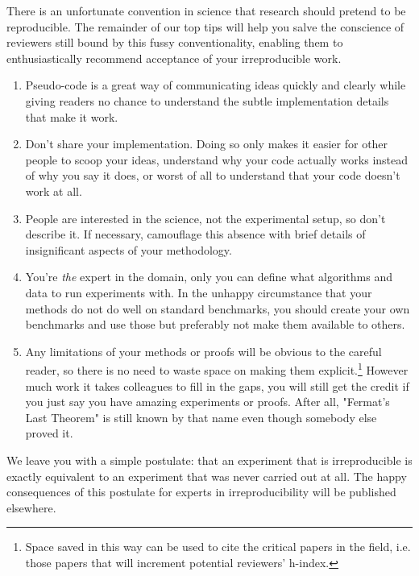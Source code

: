 \documentclass[a4paper,11pt]{article}
\begin{document}
There is an unfortunate convention in science that research should pretend to be reproducible. The remainder of our top tips will help you salve the conscience of reviewers still bound by this fussy conventionality, enabling them to enthusiastically recommend acceptance of your irreproducible work. 

\begin{enumerate}
\item Pseudo-code is a great way of communicating ideas quickly and clearly while giving readers no chance to understand the subtle implementation details that make it work. 
\item Don't share your implementation. Doing so  only makes it easier for other people
to scoop your ideas, understand why your code actually works instead of why you say it does, or worst of all to 
understand that your code doesn't work at all. 
\item People are interested in the science, not the experimental setup, so don't
describe it.  If necessary, camouflage this absence with brief details of insignificant aspects of your methodology.
\item You're \emph{the} expert in the domain, only you can define what
algorithms and data to run experiments with. In the unhappy circumstance that your methods do not do well on standard benchmarks, you should
create your own benchmarks and use those but preferably not make them available to others.
\item Any limitations of your methods or proofs will be obvious to the
careful reader, so there is no need to waste space on making them explicit.\footnote{Space saved in this way can be used to cite the critical papers in the field, i.e. those papers that will increment potential reviewers' h-index.}  However much work it takes colleagues to fill in the gaps, you will still get the credit if you just say you have amazing experiments or proofs. 
After all, "Fermat's Last Theorem" is still known by that name even though somebody else proved it.
\end{enumerate}

We leave you with a simple postulate: that an experiment that is irreproducible is exactly equivalent to an experiment that was never carried out at all. The happy consequences of this postulate for experts in irreproducibility will be published elsewhere. 


\end{document}

